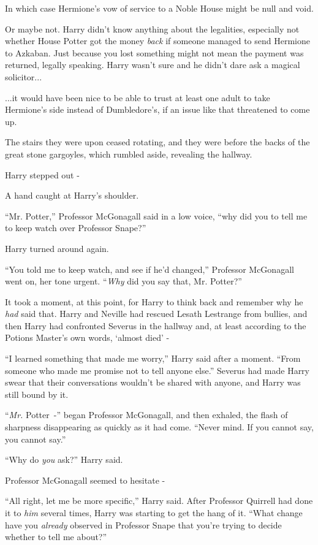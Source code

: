 In which case Hermione's vow of service to a Noble House might be null and void.

Or maybe not. Harry didn't know anything about the legalities, especially not whether House Potter got the money \emph{back} if someone managed to send Hermione to Azkaban. Just because you lost something might not mean the payment was returned, legally speaking. Harry wasn't sure and he didn't dare ask a magical solicitor...

...it would have been nice to be able to trust at least one adult to take Hermione's side instead of Dumbledore's, if an issue like that threatened to come up.

The stairs they were upon ceased rotating, and they were before the backs of the great stone gargoyles, which rumbled aside, revealing the hallway.

Harry stepped out -

A hand caught at Harry's shoulder.

``Mr. Potter,'' Professor McGonagall said in a low voice, ``why did you to tell me to keep watch over Professor Snape?''

Harry turned around again.

``You told me to keep watch, and see if he'd changed,'' Professor McGonagall went on, her tone urgent. ``\emph{Why} did you say that, Mr. Potter?''

It took a moment, at this point, for Harry to think back and remember why he \emph{had} said that. Harry and Neville had rescued Lesath Lestrange from bullies, and then Harry had confronted Severus in the hallway and, at least according to the Potions Master's own words, `almost died' -

``I learned something that made me worry,'' Harry said after a moment. ``From someone who made me promise not to tell anyone else.'' Severus had made Harry swear that their conversations wouldn't be shared with anyone, and Harry was still bound by it.

``\emph{Mr.} Potter~-'' began Professor McGonagall, and then exhaled, the flash of sharpness disappearing as quickly as it had come. ``Never mind. If you cannot say, you cannot say.''

``Why do \emph{you} ask?'' Harry said.

Professor McGonagall seemed to hesitate -

``All right, let me be more specific,'' Harry said. After Professor Quirrell had done it to \emph{him} several times, Harry was starting to get the hang of it. ``What change have you \emph{already} observed in Professor Snape that you're trying to decide whether to tell me about?''

